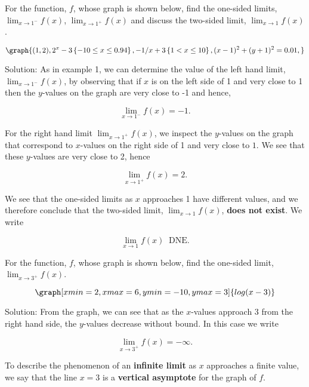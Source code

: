 \documentclass{ximera}
\begin{document}
\begin{example} %
For the function, $f$, whose graph is shown below, find the one-sided limits,
$\lim_{x \to 1^-}f(x)$, $\lim_{x \to 1^+}f(x)$ and discuss the two-sided limit, $\lim_{x \to 1} f(x)$.

\[
\graph{(1,2),
2^x -3 \left\{-10 \leq x \leq 0.94 \right\}, 
-1/x +3 \left\{1 < x \leq 10 \right\}, (x-1)^2 + (y+1)^2 = 0.01,
}
\]




Solution: As in example 1, we can determine the value of the left hand limit, $\lim_{x \to 1^-}f(x)$, 
by observing that if $x$ is on the left side of 1 and very close to 1 then the $y$-values on the 
graph are very close to -1 and hence, 

\[
\lim_{x \to 1^-}f(x) = -1.
\]

For the right hand limit $\lim_{x \to 1^+}f(x)$, we inspect the $y$-values on the 
graph that correspond to $x$-values on the right side of 1 and very close to $1$.  
We see that these $y$-values are very close to 2, hence

\[
\lim_{x \to 1^+}f(x) = 2.
\]

We see that the one-sided limits as $x$ approaches 1 have different values, and we therefore 
conclude that the two-sided limit, $\lim_{x \to 1}f(x)$, {\bf does not exist}.  We write

\[
\lim_{x \to 1}f(x) \;\;\mbox{DNE}.
\]

\end{example}

\begin{example} %
For the function, $f$, whose graph is shown below, find the one-sided limit,
$\lim_{x \to 3^+}f(x)$.

\[
\graph[xmin=2, xmax=6, ymin=-10, ymax=3]{log(x-3)}
\]



Solution: From the graph, we can see that as the $x$-values approach 3 from the right hand side, the $y$-values decrease without bound.  In this case we write

\[
\lim_{x \to 3^+}f(x) = -\infty.
\]

To describe the phenomenon of an {\bf infinite limit} as $x$ approaches a finite value, 
we say that the line $x = 3$ is a {\bf vertical asymptote} for the graph of $f$.

\end{example}
\end{document}
